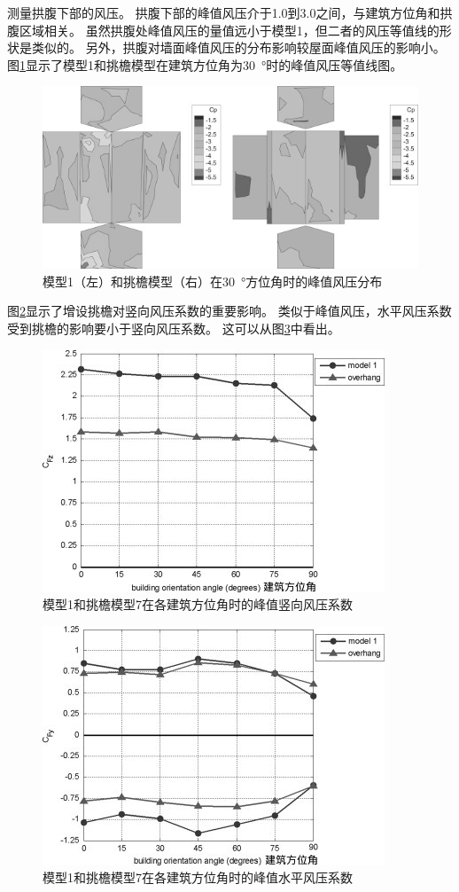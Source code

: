 \documentclass{ctexart}
\begin{document}
测量拱腹下部的风压。
拱腹下部的峰值风压介于\num{1.0}到\num{3.0}之间，与建筑方位角和拱腹区域相关。
虽然拱腹处峰值风压的量值远小于模型1，但二者的风压等值线的形状是类似的。
另外，拱腹对墙面峰值风压的分布影响较屋面峰值风压的影响小。
图\ref{fig:10}显示了模型1和挑檐模型在建筑方位角为\SI{30}{\degree}时的峰值风压等值线图。
\begin{figure}
\centering
\includegraphics[width=0.7\linewidth]{./fig/10.jpg}
\caption{模型1（左）和挑檐模型（右）在\SI{30}{\degree}方位角时的峰值风压分布}
\label{fig:10}
\end{figure}

图\ref{fig:11}显示了增设挑檐对竖向风压系数的重要影响。
类似于峰值风压，水平风压系数受到挑檐的影响要小于竖向风压系数。
这可以从图\ref{fig:12}中看出。
\begin{figure}
\centering
\includegraphics{./fig/11.jpg}
\caption{模型1和挑檐模型7在各建筑方位角时的峰值竖向风压系数}
\label{fig:11}
\end{figure}

\begin{figure}
\centering
\includegraphics{./fig/12.jpg}
\caption{模型1和挑檐模型7在各建筑方位角时的峰值水平风压系数}
\label{fig:12}
\end{figure}
\end{document}
